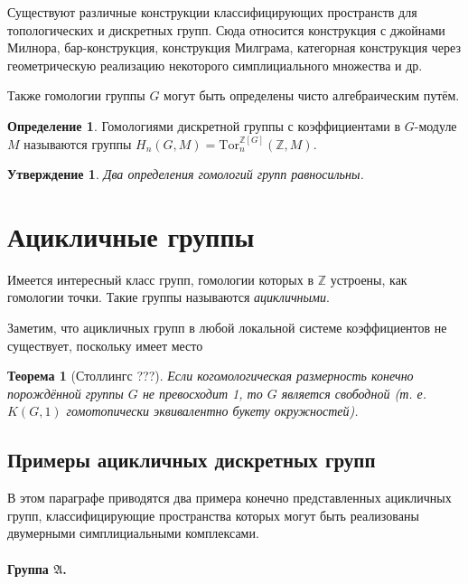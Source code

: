 \documentclass[14pt, dvipsnames]{extarticle}
\newtheorem{theorem}{Теорема}
\newtheorem{statement}{Утверждение}
\theoremstyle{definition}
\newtheorem{defi}{Определение}
\theoremstyle{remark}
\newcommand{\factor}[2]{{\raisebox{.2em}{$#1$}\left/\raisebox{-.2em}{$#2$}\right.}}
\begin{document}
Существуют различные конструкции классифицирующих пространств для топологических и дискретных групп. Сюда относится конструкция с джойнами Милнора, бар-конструкция, конструкция Милграма, категорная конструкция через геометрическую реализацию некоторого симплициального множества и др.

Также гомологии группы $G$ могут быть определены чисто алгебраическим путём.

\begin{defi}
Гомологиями дискретной группы с коэффициентами в $G$-модуле $M$ называются группы $H_n(G, M)=\mathrm{Tor}^{\mathbb{Z}[G]}_n(\mathbb{Z}, M)$.
\end{defi}


\begin{statement}
Два определения гомологий групп равносильны.
\end{statement}







\section{Ацикличные группы}

 Имеется интересный класс групп, гомологии которых в $\mathbb{Z}$ устроены, как гомологии точки. Такие группы называются {\it ацикличными}. 
 
 Заметим, что ацикличных групп в любой локальной системе коэффициентов не существует, поскольку имеет место
 
 \begin{theorem}[Столлингс ???]
 Если когомологическая размерность конечно порождённой группы $G$ не превосходит 1, то $G$ является свободной (т. е. $K(G, 1)$ гомотопически эквивалентно букету окружностей).
 \end{theorem}
 


\subsection{Примеры ацикличных дискретных групп}

В этом параграфе приводятся два примера конечно представленных ацикличных групп, классифицирующие пространства которых могут быть реализованы двумерными симплициальными комплексами. 

\paragraph{Группа $\mathfrak{A}$.} 
\end{document}

